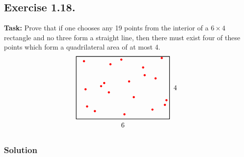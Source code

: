 \documentclass{article}
\begin{document}
\subsection{Exercise 1.18.} 
\textbf{Task:} Prove that if one chooses any 19 points from the interior of a $6 \times 4$ rectangle and no three form a straight line, then there must exist four of these points which form a quadrilateral area of at most 4.
\[
    \begin{tikzpicture}[scale=0.8] 
    
    \draw[thick] (0,0) rectangle (6,4);

    \draw (3,-0.1) node[below] {6}; %
    \draw (6.1,2) node[right] {4};  %
    
    \foreach \x/\y in {0.5/3.7, 1.8/2.3, 2.9/3.8, 3.7/1.4, 5.1/2.6, 1.2/0.5, 
                       4.3/3.3, 5.5/3.9, 0.7/0.8, 2.1/1.7, 3.4/2.4, 4.9/0.6,
                       0.6/1.9, 5.8/1.2, 3.1/0.3, 2.2/3.5, 1.6/2.1, 4.4/2.8, 5.7/0.9} {
        \fill[red] (\x,\y) circle (2pt);
    }
    \end{tikzpicture}
\]

\subsubsection*{Solution}
\end{document}
